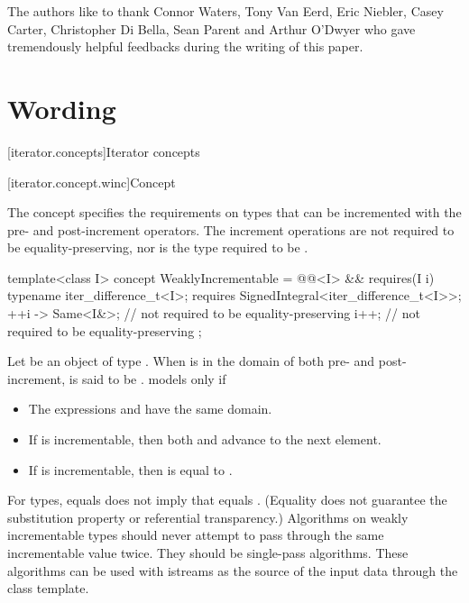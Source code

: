 \documentclass{wg21}
\begin{document}
The authors like to thank Connor Waters, Tony Van Eerd, Eric Niebler,
Casey Carter, Christopher Di Bella, Sean Parent and Arthur O'Dwyer who
gave tremendously helpful feedbacks during the writing of this paper.


\section{Wording}


[iterator.concepts]{Iterator concepts}


[iterator.concept.winc]{Concept }

\pnum
The  concept specifies the requirements on
types that can be incremented with the pre- and post-increment operators.
The increment operations are not required to be equality-preserving,
nor is the type required to be .

%
\begin{codeblock}
	template<class I>
	concept WeaklyIncrementable =
	@@<I> &&
	requires(I i) {
		typename iter_difference_t<I>;
		requires SignedIntegral<iter_difference_t<I>>;
		{ ++i } -> Same<I&>; // not required to be equality-preserving
		i++; // not required to be equality-preserving
	};
\end{codeblock}

\pnum
Let  be an object of type . When  is in the domain of
both pre- and post-increment,  is said to be .
 models  only if

\begin{itemize}
	\item The expressions  and  have the same domain.
	\item If  is incrementable, then both 
	and  advance  to the next element.
	\item If  is incrementable, then
	 is equal to
	.
\end{itemize}

\pnum
\begin{note}
	For   types,  equals  does not imply that 
	equals . (Equality does not guarantee the substitution property or referential
	transparency.) Algorithms on weakly incrementable types should never attempt to pass
	through the same incrementable value twice. They should be single-pass algorithms. These algorithms
	can be used with istreams as the source of the input data through the  class
	template.
\end{note}
\end{document}
